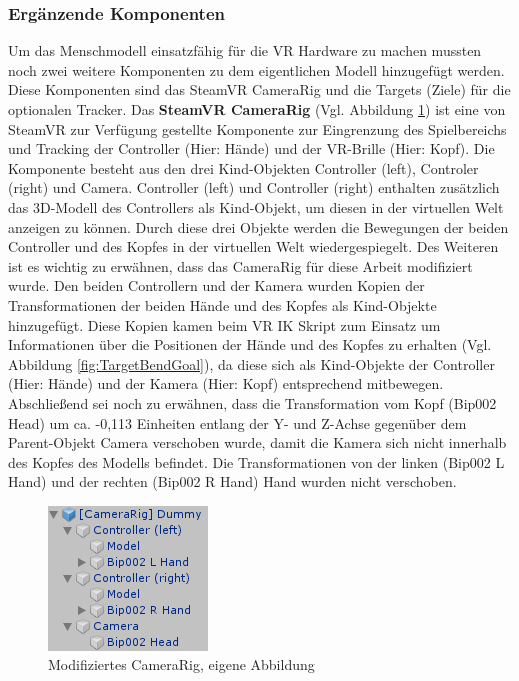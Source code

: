 \subsubsection{Ergänzende Komponenten}\label{sec:MMKomponenten}
Um das Menschmodell einsatzfähig für die VR Hardware zu machen mussten noch zwei weitere Komponenten zu dem eigentlichen Modell hinzugefügt werden. Diese Komponenten sind das SteamVR CameraRig und die Targets (Ziele) für die optionalen Tracker.
\newline\newline
Das \textbf{SteamVR CameraRig} (Vgl. Abbildung \ref{fig:CameraRig}) ist eine von SteamVR zur Verfügung gestellte Komponente zur Eingrenzung des Spielbereichs und Tracking der Controller (Hier: Hände) und der VR-Brille (Hier: Kopf). Die Komponente besteht aus den drei Kind-Objekten Controller (left), Controler (right) und Camera. Controller (left) und Controller (right) enthalten zusätzlich das 3D-Modell des Controllers als Kind-Objekt, um diesen in der virtuellen Welt anzeigen zu können. 
\newline
Durch diese drei Objekte werden die Bewegungen der beiden Controller und des Kopfes in der virtuellen Welt wiedergespiegelt. Des Weiteren ist es wichtig zu erwähnen, dass das CameraRig für diese Arbeit modifiziert wurde. Den beiden Controllern und der Kamera wurden Kopien der Transformationen der beiden Hände und des Kopfes als Kind-Objekte hinzugefügt. Diese Kopien kamen beim VR IK Skript zum Einsatz um Informationen über die Positionen der Hände und des Kopfes zu erhalten (Vgl. Abbildung \ref{fig:TargetBendGoal}), da diese sich als Kind-Objekte der Controller (Hier: Hände) und der Kamera (Hier: Kopf) entsprechend mitbewegen.
\newline
Abschließend sei noch zu erwähnen, dass die Transformation vom Kopf (Bip002 Head) um ca. -0,113 Einheiten entlang der Y- und Z-Achse gegenüber dem Parent-Objekt Camera verschoben wurde, damit die Kamera sich nicht innerhalb des Kopfes des Modells befindet. Die Transformationen von der linken (Bip002 L Hand) und der rechten (Bip002 R Hand) Hand wurden nicht verschoben.
\begin{figure}[h]
	\centering
	\includegraphics[width=0.25\linewidth]{Bilder/A37_CameraRig}
	\caption{Modifiziertes CameraRig, eigene Abbildung}
	\label{fig:CameraRig}
\end{figure}
